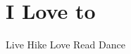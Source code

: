 \begin{aside}
    ~
    ~
    ~
    ~
    ~
    ~
    ~
    ~
    ~
    ~
    ~
    ~
    ~
    ~
    ~
    ~
    ~
    ~
    ~
    ~
    ~
    ~
    ~
    ~
    ~
    ~
    ~
    ~
    ~
    ~
    ~
    ~
    \section{I Love to}
    Live
    Hike
    Love
    Read
    Dance
    ~
\end{aside}